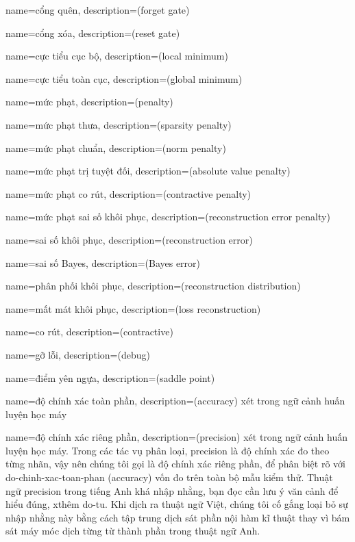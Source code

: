 {
    name={cổng quên},
    description={(forget gate)}
}

{
    name={cổng xóa},
    description={(reset gate)}
}

{
    name={cực tiểu cục bộ},
    description={(local minimum)}
}

{
    name={cực tiểu toàn cục},
    description={(global minimum)}
}

{
    name={mức phạt},
    description={(penalty)}
}

{
    name={mức phạt thưa},
    description={(sparsity penalty)}
}

{
    name={mức phạt chuẩn},
    description={(norm penalty)}
}

{
    name={mức phạt trị tuyệt đối},
    description={(absolute value penalty)}
}

{
    name={mức phạt co rút},
    description={(contractive penalty)}
}

{
    name={mức phạt sai số khôi phục},
    description={(reconstruction error penalty)}
}

{
    name={sai số khôi phục},
    description={(reconstruction error)}
}

{
    name={sai số Bayes},
    description={(Bayes error)}
}

{
    name={phân phối khôi phục},
    description={(reconstruction distribution)}
}

{
    name={mất mát khôi phục},
    description={(loss reconstruction)}
}

{
    name={co rút},
    description={(contractive)}
}

{
    name={gỡ lỗi},
    description={(debug)}
}

{
    name={điểm yên ngựa},
    description={(saddle point)}
}

{
    name={độ chính xác toàn phần},
    description={(accuracy) xét trong ngữ cảnh huấn luyện học máy}
}

{
    name={độ chính xác riêng phần},
    description={(precision) xét trong ngữ cảnh huấn luyện học máy.
        Trong các tác vụ phân loại, precision là độ chính xác đo
        theo từng nhãn, vậy nên chúng tôi gọi là độ chính xác riêng phần,
        để phân biệt rõ với \gls{do-chinh-xac-toan-phan} (accuracy) vốn
        đo trên toàn bộ mẫu kiểm thử. Thuật ngữ precision trong tiếng Anh
        khá nhập nhằng, bạn đọc cần lưu ý văn cảnh để hiểu đúng, xthêm
        \gls{do-tu}. Khi dịch ra thuật ngữ Việt, chúng tôi cố gắng loại bỏ
        sự nhập nhằng này bằng cách tập trung dịch sát phần nội hàm kĩ thuật
        thay vì bám sát máy móc dịch từng từ thành phần trong thuật ngữ Anh.}
}

